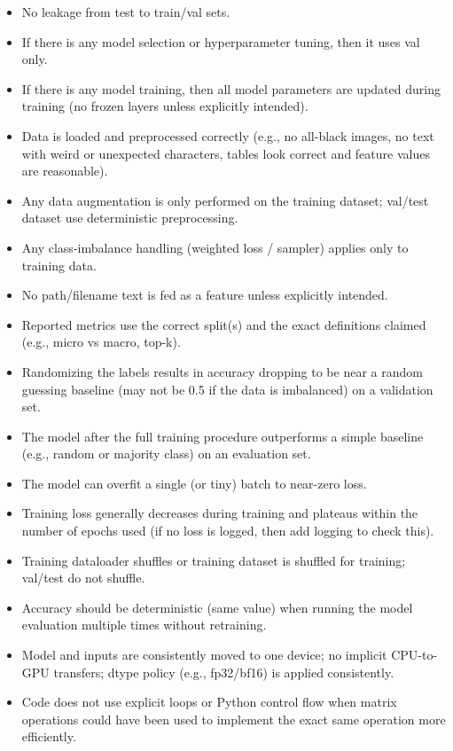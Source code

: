 \documentclass[11pt]{article}
\begin{document}
\begin{itemize}
  \item No leakage from test to train/val sets.
  \item If there is any model selection or hyperparameter tuning, then it uses val only.
  \item If there is any model training, then all model parameters are updated during training (no frozen layers unless explicitly intended).
  \item Data is loaded and preprocessed correctly (e.g., no all-black images, no text with weird or unexpected characters, tables look correct and feature values are reasonable).
  \item Any data augmentation is only performed on the training dataset; val/test dataset use deterministic preprocessing.
  \item Any class-imbalance handling (weighted loss / sampler) applies only to training data.
  \item No path/filename text is fed as a feature unless explicitly intended.
  \item Reported metrics use the correct split(s) and the exact definitions claimed (e.g., micro vs macro, top-k).
  \item Randomizing the labels results in accuracy dropping to be near a random guessing baseline (may not be 0.5 if the data is imbalanced) on a validation set.
  \item The model after the full training procedure outperforms a simple baseline (e.g., random or majority class) on an evaluation set.
  \item The model can overfit a single (or tiny) batch to near-zero loss.
  \item Training loss generally decreases during training and plateaus within the number of epochs used (if no loss is logged, then add logging to check this).
  \item Training dataloader shuffles or training dataset is shuffled for training; val/test do not shuffle.
  \item Accuracy should be deterministic (same value) when running the model evaluation multiple times without retraining.
  \item Model and inputs are consistently moved to one device; no implicit CPU-to-GPU transfers; dtype policy (e.g., fp32/bf16) is applied consistently.
  \item Code does not use explicit loops or Python control flow when matrix operations could have been used to implement the exact same operation more efficiently.
\end{itemize}
\end{document}
